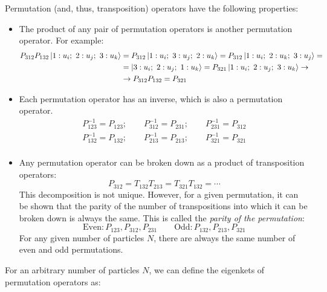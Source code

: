 Permutation (and, thus, transposition) operators have the following properties:
\begin{itemize}
    \item The product of any pair of permutation operators is another permutation operator. For example:
    \begin{equation}
        \begin{split}
            P_{312}P_{132}\ket{1:u_i;\ 2:u_j;\ 3:u_k} &= P_{312}\ket{1:u_i;\ 3:u_j;\ 2:u_k} = P_{312}\ket{1:u_i;\ 2:u_k;\ 3:u_j} = \\
            &= \ket{3:u_i;\ 2:u_j;\ 1:u_k} = P_{321}\ket{1:u_i;\ 2:u_j;\ 3:u_k} \rightarrow\\
            &\rightarrow P_{312}P_{132} = P_{321}
        \end{split}
    \end{equation}
    \item Each permutation operator has an inverse, which is also a permutation operator.
    \begin{equation}
        \begin{split}
            P_{123}^{-1} = P_{123}; \qquad P_{312}^{-1} = P_{231};\qquad P_{231}^{-1} = P_{312}\\
            P_{132}^{-1} = P_{132}; \qquad P_{213}^{-1} = P_{213};\qquad P_{321}^{-1} = P_{321}\\
        \end{split}
    \end{equation}
    \item Any permutation operator can be broken down as a product of transposition operators:
    \begin{equation}
        P_{312} = T_{132}T_{213} = T_{321}T_{132} = \cdots
    \end{equation}
    This decomposition is not unique. However, for a given permutation, it can be shown that the parity of the number of transpositions into which it can be broken down is always the same. This is called the \textit{parity of the permutation}:
    $$
    \text{Even}: P_{123}, P_{312}, P_{231}\qquad
    \text{Odd}: P_{132}, P_{213}, P_{321}
    $$
    For any given number of particles $N$, there are always the same number of even and odd permutations.
\end{itemize}

For an arbitrary number of particles $N$, we can define the eigenkets of permutation operators as:

